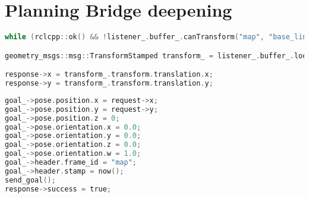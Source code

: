\chapter{Planning Bridge deepening}
\label{cha:deepening}

\newsavebox\poseserver

\noindent\begin{lrbox}{\poseserver}
  \noindent\begin{lstlisting}[language=C, style=CStyleTextWidth]
while (rclcpp::ok() && !listener_.buffer_.canTransform("map", "base_link", tf2::TimePoint())) rate.sleep();

geometry_msgs::msg::TransformStamped transform_ = listener_.buffer_.lookupTransform("map",  "base_link", tf2::TimePoint());

response->x = transform_.transform.translation.x;
response->y = transform_.transform.translation.y;
  \end{lstlisting}
\end{lrbox}

\newsavebox\navigationclient

\noindent\begin{lrbox}{\navigationclient}
  \noindent\begin{lstlisting}[language=C, style=CStyleNoFrame]
goal_->pose.position.x = request->x;
goal_->pose.position.y = request->y;
goal_->pose.position.z = 0;
goal_->pose.orientation.x = 0.0;
goal_->pose.orientation.y = 0.0;
goal_->pose.orientation.z = 0.0;
goal_->pose.orientation.w = 1.0;
goal_->header.frame_id = "map";
goal_->header.stamp = now();
send_goal();
response->success = true;
  \end{lstlisting}
\end{lrbox}

